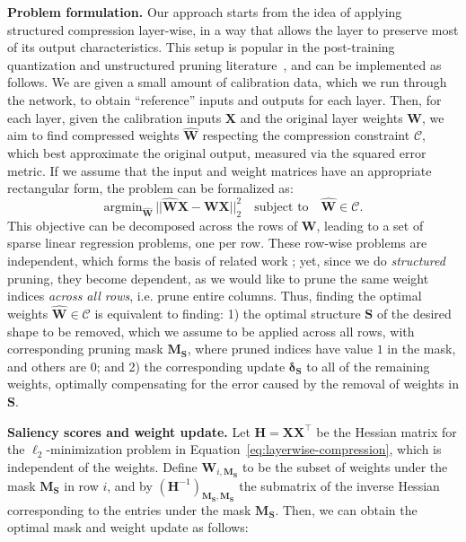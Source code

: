 \documentclass{article}
\theoremstyle{plain}
\theoremstyle{definition}
\theoremstyle{remark}
\renewcommand{\paragraph}[1]{ \noindent \textbf{#1}}
\begin{document}
\paragraph{Problem formulation.} 
Our approach starts from the idea of applying structured compression layer-wise, in a way that allows the layer to preserve most of its output characteristics. 
This setup is popular in the post-training quantization and unstructured pruning literature~\cite{nagel2020up, hubara2021accelerated, frantar2022obc}, and can be implemented as follows. 
We are given a small amount of calibration data, which we run through the network, to obtain ``reference'' inputs and outputs for each layer. 
Then, for each layer, given the calibration inputs  $\mathbf{X}$ and the original layer weights $\mathbf{{W}}$, we aim to find compressed weights $\mathbf{\widehat{W}}$ respecting the compression constraint $\mathcal{C}$, which best approximate the original output, measured via the squared error metric. 
If we assume that the input and weight matrices have an appropriate rectangular form, the problem can be formalized as: 
\begin{equation}
    \label{eq:layerwise-compression}
    \text{argmin}_\mathbf{\widehat{W}} \, ||\mathbf{\widehat{W}} \mathbf{X} - \mathbf{W} \mathbf{X}||_2^2 \quad \text{subject to} \quad \mathbf{\widehat{W}} \in \mathcal{C}.
\end{equation}
This objective can be decomposed across the rows of $\mathbf{W}$, leading to a set of sparse linear regression problems, one per row. These row-wise problems are independent, which forms the basis of related work \cite{frantar2022obc}; yet, since we do \textit{structured} pruning, they become dependent, as we would like to prune the same weight indices \emph{across all rows}, i.e. prune entire columns. 
Thus, finding the optimal weights 
$\mathbf{\widehat{W}} \in \mathcal{C}$ is equivalent to finding: 1) the optimal structure $\mathbf{S}$ of the desired shape to be removed, which we assume to be applied across all rows, with corresponding pruning mask $\mathbf{M_S}$, where pruned indices have value $1$ in the mask, and others are $0$; and 2) the corresponding update $\boldsymbol{\delta_S}$ to all of the remaining weights, optimally compensating for the error caused by the removal of weights in $\mathbf{S}$.

\paragraph{Saliency scores and weight update.} Let $\mathbf{H} = \mathbf{X}\mathbf{X}^\top$ be the Hessian matrix for the $\ell_2$-minimization problem in Equation~\ref{eq:layerwise-compression}, which is independent of the weights.
Define $\mathbf{W}_{i,\mathbf{M_S}}$ to be the subset of weights under the mask $\mathbf{M_S}$ in row $i$, 
and by $(\mathbf{H}^{-1})_{\mathbf{M_S},\mathbf{M_S}}$ the submatrix of the inverse Hessian corresponding to the entries under the mask $\mathbf{M_S}$. 
Then, we can obtain the optimal mask and weight update as follows:  
\end{document}
